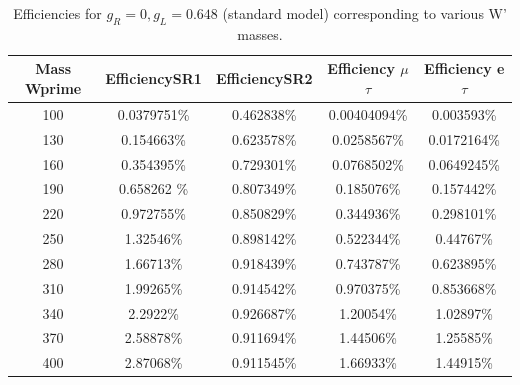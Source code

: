 \begin{table}[htb]
  \centering
  \begin{tabular}{|ccccc|}
    \hline 
    Mass Wprime & EfficiencySR1 & EfficiencySR2 & Efficiency $\mu$$\tau$ & Efficiency e $\tau$ \\
    \hline 
    100& 0.0379751\%& 0.462838\%& 0.00404094\%& 0.003593\%\\
    130& 0.154663\%& 0.623578\%& 0.0258567\%& 0.0172164\%\\
    160& 0.354395\%& 0.729301\%& 0.0768502\%& 0.0649245\%\\
    190& 0.658262 \%& 0.807349\%& 0.185076\%& 0.157442\%\\
    220& 0.972755\%& 0.850829\%& 0.344936\%& 0.298101\%\\
    250& 1.32546\%& 0.898142\%& 0.522344\%& 0.44767\%\\ 
    280& 1.66713\%& 0.918439\%& 0.743787\%& 0.623895\%\\
    310& 1.99265\%& 0.914542\%& 0.970375\%& 0.853668\%\\
    340& 2.2922\%& 0.926687\%& 1.20054\%& 1.02897\%\\
    370& 2.58878\%& 0.911694\%& 1.44506\%& 1.25585\%\\
    400& 2.87068\%& 0.911545\%& 1.66933\%& 1.44915\%\\
    \hline
  \end{tabular}
  \caption{Efficiencies for $ g_R=0 , g_L=0.648 $ (standard model) corresponding to various W' masses. \label{eff-SM} }
\end{table}


